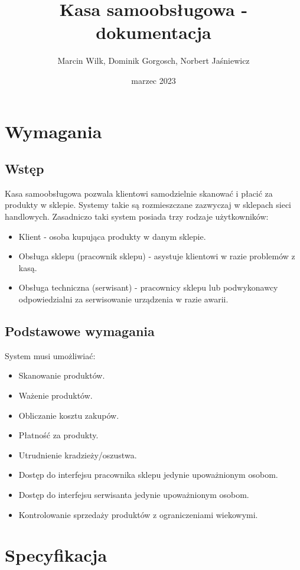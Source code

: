 \documentclass{article}
\title{Kasa samoobsługowa - dokumentacja}
\author{Marcin Wilk, Dominik Gorgosch, Norbert Jaśniewicz}
\date{marzec 2023}
\begin{document}
\maketitle
\tableofcontents
\newpage

\section{Wymagania}
    \subsection{Wstęp}
         Kasa samoobsługowa pozwala klientowi samodzielnie skanować i płacić za produkty w sklepie. Systemy takie są rozmieszczane zazwyczaj w sklepach sieci handlowych. Zasadniczo taki system posiada trzy rodzaje użytkowników:
            \begin{itemize}
                \item Klient - osoba kupująca produkty w danym sklepie.
                \item Obsługa sklepu (pracownik sklepu) - asystuje klientowi w razie problemów z kasą.
                \item Obsługa techniczna (serwisant) - pracownicy sklepu lub podwykonawcy odpowiedzialni za serwisowanie urządzenia w razie awarii.
            \end{itemize}
    \subsection{Podstawowe wymagania}
    System musi umożliwiać:
    \begin{itemize}
        \item Skanowanie produktów.
        \item Ważenie produktów.
        \item Obliczanie kosztu zakupów.
        \item Płatność za produkty.
        \item Utrudnienie kradzieży/oszustwa.
        \item Dostęp do interfejsu pracownika sklepu jedynie upoważnionym osobom.
        \item Dostęp do interfejsu serwisanta jedynie upoważnionym osobom.
        \item Kontrolowanie sprzedaży produktów z ograniczeniami wiekowymi.
    \end{itemize}
\section{Specyfikacja}
\end{document}
